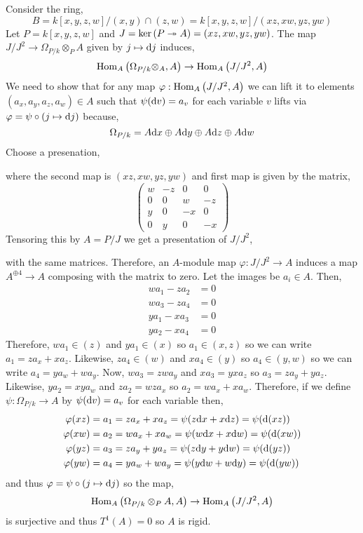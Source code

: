 \documentclass[12pt]{article}
\begin{document}
Consider the ring,
\[ B = k[x,y,z,w]/(x,y) \cap (z,w) = k[x,y,z,w]/(xz,xw,yz,yw) \]
Let $P = k[x,y,z,w]$ and $J = \ker{(P \twoheadrightarrow A)} = (xz,xw,yz,yw)$. The map $J/J^2 \to \Omega_{P/k} \otimes_P A$ given by $j \mapsto \mathrm{d}{j}$ induces,
\[ \mathrm{Hom}_{A} \left( \Omega_{P/k} \otimes_A, A \right) \to \mathrm{Hom}_{A} \left( J/J^2, A \right) \]
We need to show that for any map $\varphi : \mathrm{Hom}_{A} \left( J/J^2, A \right)$ we can lift it to elements $(a_x, a_y, a_z, a_w) \in A$ such that $\psi(\mathrm{d}{v}) = a_v$ for each variable $v$ lifts via $\varphi = \psi \circ (j \mapsto \mathrm{d}{j})$ because, 
\[ \Omega_{P/k} = A \mathrm{d}{x} \oplus A \mathrm{d}{y} \oplus A \mathrm{d}{z} \oplus A \mathrm{d}{w} \]
Choose a presenation,
\begin{center}
\end{center}
where the second map is $(xz, xw, yz, yw)$ and first map is given by the matrix,
\[ \begin{pmatrix}
w & - z & 0 & 0
\\
0 & 0 & w & - z
\\
y & 0 & -x & 0
\\
0 & y & 0 & -x
\end{pmatrix} \]
Tensoring this by $A = P/J$ we get a presentation of $J/J^2$,
\begin{center}
\end{center}
with the same matrices. Therefore, an $A$-module map $\varphi : J/J^2 \to A$ induces a map $A^{\oplus 4} \to A$ composing with the matrix to zero. Let the images be $a_i \in A$. Then, 
\begin{align*}
w a_1 - z a_2 &= 0
\\
w a_3 - z a_4 &= 0
\\
y a_1 - x a_3 &= 0
\\
y a_2 - x a_4 &= 0
\end{align*}
Therefore, $w a_1 \in (z)$ and $y a_1 \in (x)$ so $a_1 \in (x, z)$ so we can write $a_1 = z a_x + x a_z$. Likewise, $z a_4 \in (w)$ and $x a_4 \in (y)$ so $a_4 \in (y,w)$ so we can write $a_4 = y a_w + w a_y$. Now, $w a_3 = zw a_y$ and $x a_3 = yx a_z$ so $a_3 = z a_y + y a_z$. Likewise, $y a_2 = xy a_w$ and $z a_2 = w z a_x$ so $a_2 = w a_x + x a_w$. Therefore, if we define $\psi : \Omega_{P/k} \to A$ by $\psi(\mathrm{d}{v}) = a_v$ for each variable then,
\begin{align*}
\varphi(xz) = a_1 & = z a_x + x a_z = \psi(z \mathrm{d}{x} + x \mathrm{d}{z}) = \psi(\mathrm{d}{(xz)})
\\
\varphi(xw) = a_2 & = w a_x + x a_w = \psi(w \mathrm{d}{x} + x \mathrm{d}{w}) = \psi(\mathrm{d}{(xw)})
\\
\varphi(yz) = a_3 & = z a_y + y a_z = \psi(z \mathrm{d}{y} + y \mathrm{d}{w}) = \psi(\mathrm{d}{(yz)})
\\
\varphi(yw) = a_4 & = y a_w + w a_y = \psi(y \mathrm{d}{w} + w \mathrm{d}{y}) = \psi(\mathrm{d}{(yw)})
\end{align*}
and thus $\varphi = \psi \circ (j \mapsto \mathrm{d}{j})$ so the map,
\[ \mathrm{Hom}_{A} \left( \Omega_{P/k} \otimes_P A, A \right) \to \mathrm{Hom}_{A} \left( J/J^2, A \right) \]
is surjective and thus $T^1(A) = 0$ so $A$ is rigid.
\end{document}
